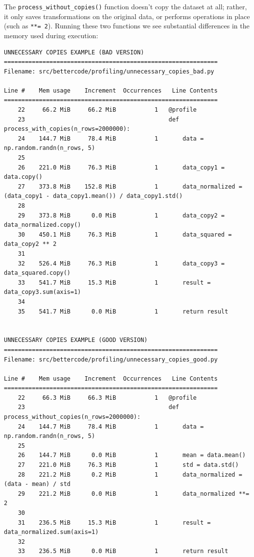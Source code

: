 The \texttt{process\_without\_copies()} function doesn't copy the dataset at all; rather, it only saves transformations on the original data, or performs operations in place (such as \texttt{**= 2}).  Running these two functions we see substantial differences in the memory used during execution:

\begin{lstlisting}[style=shell]
UNNECESSARY COPIES EXAMPLE (BAD VERSION)
=============================================================
Filename: src/bettercode/profiling/unnecessary_copies_bad.py

Line #    Mem usage    Increment  Occurrences   Line Contents
=============================================================
    22     66.2 MiB     66.2 MiB           1   @profile
    23                                         def process_with_copies(n_rows=2000000):
    24    144.7 MiB     78.4 MiB           1       data = np.random.randn(n_rows, 5)
    25                                             
    26    221.0 MiB     76.3 MiB           1       data_copy1 = data.copy() 
    27    373.8 MiB    152.8 MiB           1       data_normalized = (data_copy1 - data_copy1.mean()) / data_copy1.std()
    28                                             
    29    373.8 MiB      0.0 MiB           1       data_copy2 = data_normalized.copy() 
    30    450.1 MiB     76.3 MiB           1       data_squared = data_copy2 ** 2
    31                                             
    32    526.4 MiB     76.3 MiB           1       data_copy3 = data_squared.copy() 
    33    541.7 MiB     15.3 MiB           1       result = data_copy3.sum(axis=1)
    34                                             
    35    541.7 MiB      0.0 MiB           1       return result


UNNECESSARY COPIES EXAMPLE (GOOD VERSION)
=============================================================
Filename: src/bettercode/profiling/unnecessary_copies_good.py

Line #    Mem usage    Increment  Occurrences   Line Contents
=============================================================
    22     66.3 MiB     66.3 MiB           1   @profile
    23                                         def process_without_copies(n_rows=2000000):
    24    144.7 MiB     78.4 MiB           1       data = np.random.randn(n_rows, 5) 
    25                                             
    26    144.7 MiB      0.0 MiB           1       mean = data.mean()
    27    221.0 MiB     76.3 MiB           1       std = data.std()
    28    221.2 MiB      0.2 MiB           1       data_normalized = (data - mean) / std  
    29    221.2 MiB      0.0 MiB           1       data_normalized **= 2  
    30                                             
    31    236.5 MiB     15.3 MiB           1       result = data_normalized.sum(axis=1)
    32                                             
    33    236.5 MiB      0.0 MiB           1       return result
\end{lstlisting}

